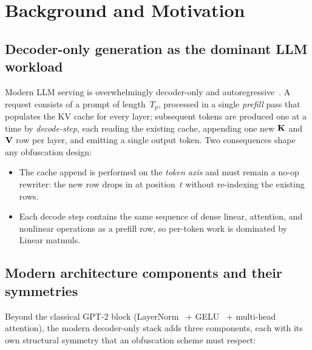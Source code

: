 \section{Background and Motivation}
\label{sec:background}

\subsection{Decoder-only generation as the dominant LLM workload}
Modern LLM serving is overwhelmingly decoder-only and autoregressive~\cite{vaswani2017attention, radford2019language, touvron2023llama}. A request consists of a prompt of length~$T_p$, processed in a single \emph{prefill} pass that populates the KV cache for every layer; subsequent tokens are produced one at a time by \emph{decode-step}, each reading the existing cache, appending one new $\mathbf{K}$ and $\mathbf{V}$ row per layer, and emitting a single output token. Two consequences shape any obfuscation design:

\begin{itemize}[leftmargin=*, nosep]
  \item The cache append is performed on the \emph{token axis} and must remain a no-op rewriter: the new row drops in at position~$t$ without re-indexing the existing rows.
  \item Each decode step contains the same sequence of dense linear, attention, and nonlinear operations as a prefill row, so per-token work is dominated by Linear matmuls.
\end{itemize}

\subsection{Modern architecture components and their symmetries}
Beyond the classical GPT-2 block (LayerNorm~\cite{ba2016layernorm} + GELU~\cite{hendrycks2016gelu} + multi-head attention), the modern decoder-only stack adds three components, each with its own structural symmetry that an obfuscation scheme must respect:

